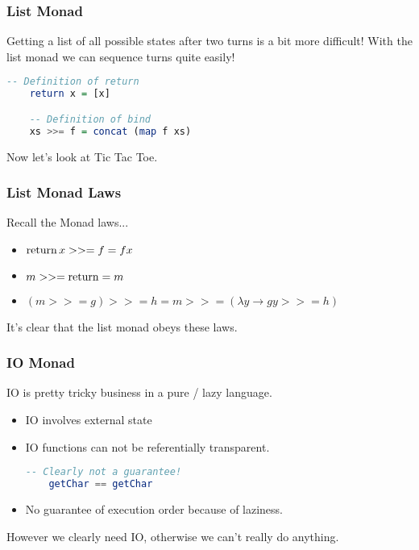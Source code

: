 \documentclass[presentation.tex]{subfiles}
\begin{document}
\begin{frame}[fragile]
  \frametitle{List Monad}

  Getting a list of all possible states after two turns is a bit more
  difficult! With the list monad we can sequence turns quite easily!

  \begin{lstlisting}[frame=single,language=Haskell,breaklines=true]
    -- Definition of return
    return x = [x]

    -- Definition of bind
    xs >>= f = concat (map f xs)
  \end{lstlisting}

  Now let's look at Tic Tac Toe.
\end{frame}

\begin{frame}[fragile]
  \frametitle{List Monad Laws}

  Recall the Monad laws...

  \begin{itemize}
  \item
    $\operatorname{return} x >>= f = f x$
  \item
    $m >>= \operatorname{return} = m$
  \item
    $(m >>= g) >>= h = m >>= (\lambda y \rightarrow g y >>= h)$
  \end{itemize}

  It's clear that the list monad obeys these laws.
\end{frame}

\begin{frame}[fragile]
  \frametitle{IO Monad}

  IO is pretty tricky business in a pure / lazy language.

  \begin{itemize}
  \item IO involves external state
  \item IO functions can not be referentially transparent.

  \begin{lstlisting}[frame=single,language=Haskell,breaklines=true]
    -- Clearly not a guarantee!
    getChar == getChar
  \end{lstlisting}

  \item No guarantee of execution order because of laziness.
  \end{itemize}

  However we clearly need IO, otherwise we can't really do anything.
\end{frame}
\end{document}

